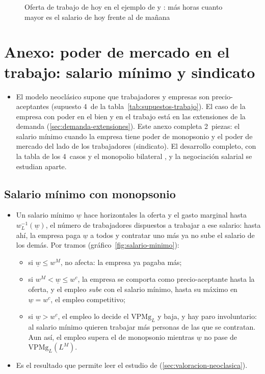 \documentclass[11pt]{article}
\begin{document}
\begin{figure}[H]
\centering
\caption{Oferta de trabajo de hoy en el ejemplo de  y : más horas cuanto mayor es el salario de hoy frente al de mañana}\label{fig:lr-oferta}
\end{figure}

\section{Anexo: poder de mercado en el trabajo:\cortetitulo{} salario mínimo y sindicato}\label{anexo:poder-mercado-trabajo}

\begin{itemize}
\item El modelo neoclásico supone que trabajadores y empresas son precio-aceptantes (supuesto 4~de la tabla~\ref{tab:supuestos-trabajo}). El caso de la empresa con poder en el bien y en el trabajo está en las extensiones de la demanda (\ref{sec:demanda-extensiones}). Este anexo completa 2~piezas: el salario mínimo cuando la empresa tiene poder de monopsonio y el poder de mercado del lado de los trabajadores (sindicato). El desarrollo completo, con la tabla de los 4~casos y el monopolio bilateral , y la negociación salarial  se estudian aparte.
\end{itemize}

\subsection{Salario mínimo con monopsonio}\label{anexo:salario-minimo}

\begin{itemize}
\item Un salario mínimo $\underline{w}$ hace horizontales la oferta y el gasto marginal hasta $w_L^{-1}(\underline{w})$, el número de trabajadores dispuestos a trabajar a ese salario: hasta ahí, la empresa paga $\underline{w}$ a todos y contratar uno más ya no sube el salario de los demás. Por tramos (gráfico~\ref{fig:salario-minimo}):
  \begin{itemize}
  \item si $\underline{w}\leq w^M$, no afecta: la empresa ya pagaba más;
  \item si $w^M<\underline{w}\leq w^c$, la empresa se comporta como precio-aceptante hasta la oferta, y el empleo \emph{sube} con el salario mínimo, hasta su máximo en $\underline{w}=w^c$, el empleo competitivo;
  \item si $\underline{w}>w^c$, el empleo lo decide el $\mathrm{VPMg}_L$ y baja, y hay paro involuntario: al salario mínimo quieren trabajar más personas de las que se contratan. Aun así, el empleo supera el de monopsonio mientras $\underline{w}$ no pase de $\mathrm{VPMg}_L(L^M)$.
  \end{itemize}
\item Es el resultado que permite leer el estudio de \textcite{CardKrueger1994} (\ref{sec:valoracion-neoclasica}).
\end{itemize}
\end{document}
